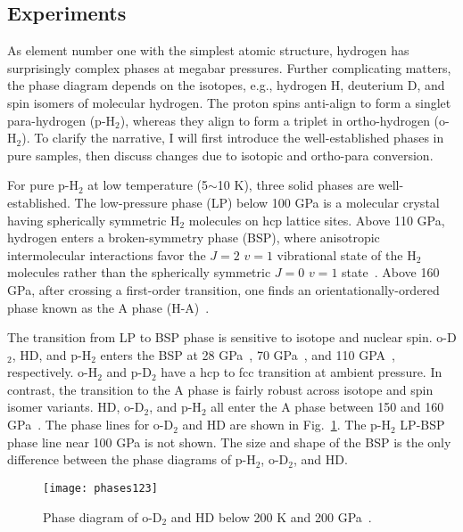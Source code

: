 \subsection{Experiments}
\label{sec:hsolid-expt}

As element number one with the simplest atomic structure, hydrogen has surprisingly complex phases at megabar pressures.
Further complicating matters, the phase diagram depends on the isotopes, e.g., hydrogen H, deuterium D, and spin isomers of molecular hydrogen.
The proton spins anti-align to form a singlet para-hydrogen (p-H$_2$), whereas they align to form a triplet in ortho-hydrogen (o-H$_2$).
To clarify the narrative, I will first introduce the well-established phases in pure samples, then discuss changes due to isotopic and ortho-para conversion.

For pure p-H$_2$ at low temperature (5$\sim$10 K), three solid phases are well-established. The low-pressure phase (LP) below 100 GPa is a molecular crystal having spherically symmetric H$_2$ molecules on hcp lattice sites. Above 110 GPa, hydrogen enters a broken-symmetry phase (BSP), where anisotropic intermolecular interactions favor the $J=2$ $v=1$ vibrational state of the H$_2$ molecules rather than the spherically symmetric $J=0$ $v=1$ state~\cite{Lorenzana1990}. Above 160 GPa, after crossing a first-order transition, one finds an orientationally-ordered phase known as the A phase (H-A)~\cite{Lorenzana1989}.

The transition from LP to BSP phase is sensitive to isotope and nuclear spin. o-D$_2$, HD, and p-H$_2$ enters the BSP at 28 GPa~\cite{Silvera1981}, 70 GPa~\cite{Chijioke2006}, and 110 GPA~\cite{Lorenzana1990}, respectively. o-H$_2$ and p-D$_2$ have a hcp to fcc transition at ambient pressure. In contrast, the transition to the A phase is fairly robust across isotope and spin isomer variants. HD, o-D$_2$, and p-H$_2$ all enter the A phase between 150 and 160 GPa~\cite{Hemley1988,Lorenzana1989,Cui1994,Chijioke2006}. The phase lines for o-D$_2$ and HD are shown in Fig.~\ref{fig:hsolid-phases123}. The p-H$_2$ LP-BSP phase line near 100 GPa is not shown. The size and shape of the BSP is the only difference between the phase diagrams of p-H$_2$, o-D$_2$, and HD.

\begin{figure}[h]
\centering
\texttt{[image: phases123]}
\caption{Phase diagram of o-D$_2$ and HD below 200 K and 200 GPa~\cite{Chijioke2006}.}
\label{fig:hsolid-phases123}
\end{figure}

